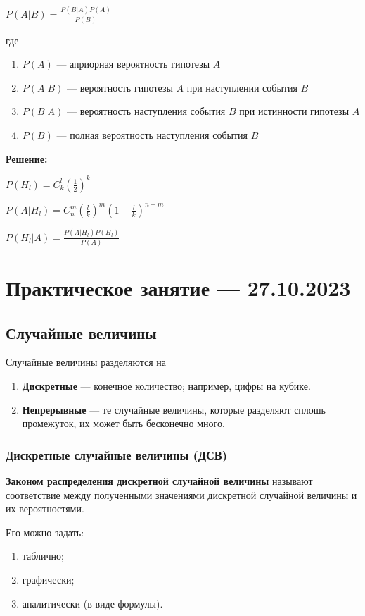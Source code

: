 \documentclass{article}
\begin{document}
$P(A|B) = \frac{P(B|A) P(A)}{P(B)}$

где

\begin{enumerate}
    \item $P(A)$ — априорная вероятность гипотезы $A$
    \item $P(A|B)$ — вероятность гипотезы $A$ при наступлении события $B$
    \item $P(B|A)$ — вероятность наступления события $B$ при истинности гипотезы $A$
    \item $P(B)$ — полная вероятность наступления события $B$
\end{enumerate}

\textbf{Решение:}

$P(H_{l}) = C_{k}^{l} (\frac{1}{2})^{k}$

$P(A|H_{l}) = C_{n}^{m} (\frac{l}{k})^{m} (1 - \frac{l}{k})^{n - m}$

$P(H_{l}|A) = \frac{P(A|H_{l}) P(H_{l})}{P(A)}$

\section{Практическое занятие — 27.10.2023}

\subsection{Случайные величины}

Случайные величины разделяются на

\begin{enumerate}
    \item \textbf{Дискретные} — конечное количество; например, цифры на кубике.
    \item \textbf{Непрерывные} — те случайные величины, которые разделяют сплошь промежуток, их может быть бесконечно много.
\end{enumerate}

\subsubsection{Дискретные случайные величины (ДСВ)}

\textbf{Законом распределения дискретной случайной величины} называют соответствие между полученными значениями дискретной случайной величины и их вероятностями.

Его можно задать:

\begin{enumerate}
    \item таблично;
    \item графически;
    \item аналитически (в виде формулы).
\end{enumerate}
\end{document}
